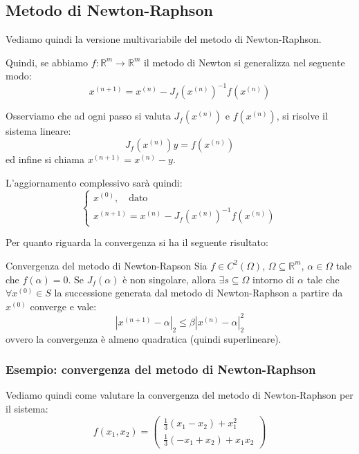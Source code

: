 \documentclass[a4paper,11pt]{article}
\begin{document}
\subsection{Metodo di Newton-Raphson}
Vediamo quindi la versione multivariabile del metodo di Newton-Raphson.

Quindi, se abbiamo $f : \mathbb{R}^m \rightarrow \mathbb{R}^m$ il metodo di Newton si generalizza nel seguente modo:
$$
x^{(n + 1)} = x^{(n)} - J_f (x^{(n)})^{-1} f(x^{(n)})
$$

Osserviamo che ad ogni passo si valuta $J_f(x^{(n)})$ e $f(x^{(n)})$, si risolve il sistema lineare:
$$
J_f(x^{(n)}) y = f(x^{(n)})
$$
ed infine si chiama $x^{(n + 1)} = x^{(n)} - y$.

L'aggiornamento complessivo sarà quindi:
\[
	\begin{cases}
		x^{(0)}, \quad \text{dato} \\
		x^{(n + 1)} = x^{(n)} - J_f(x^{(n)})^{-1} f(x^{(n)})
	\end{cases}
\]

Per quanto riguarda la convergenza si ha il seguente risultato:
\begin{theorem}{Convergenza del metodo di Newton-Rapson}
	Sia $f \in C^2(\Omega)$, $\Omega \subseteq \mathbb{R}^m$, $\alpha \in \Omega$ tale che $f(\alpha) = 0$.
	Se $J_f(\alpha)$ è non singolare, allora $\exists s \subseteq \Omega$ intorno di $\alpha$ tale che $\forall x^{(0)} \in S$ la successione generata dal metodo di Newton-Raphson a partire da $x^{(0)}$ converge e vale:
	$$
	|x^{(n + 1)} - \alpha|_2 \leq \beta |x^{(n)} - \alpha |_2^2
	$$
	ovvero la convergenza è almeno quadratica (quindi superlineare).
\end{theorem}

\subsubsection{Esempio: convergenza del metodo di Newton-Raphson}
Vediamo quindi come valutare la convergenza del metodo di Newton-Raphson per il sistema:
$$
f(x_1, x_2) =
\begin{pmatrix}
	\frac{1}{3} (x_1 - x_2) + x_1^2 \\
	\frac{1}{3} (-x_1 + x_2) + x_1 x_2
\end{pmatrix}
$$

\par\smallskip
\end{document}
